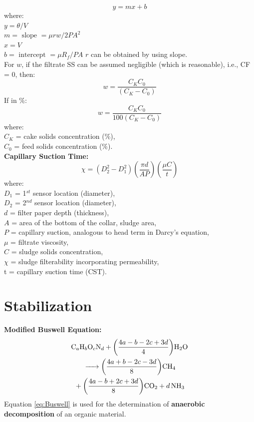 \documentclass[a4paper, landscape]{article}
\begin{document}
\begin{multicols}{4}
\[
y=mx+b
\]
where:\\
$y = \theta/V$\\
$m = \text{ slope } = \mu rw / 2 PA^2$\\
$x = V$\\
$b = \text{ intercept } = \mu R_f / PA$
$r$ can be obtained by using slope.\\
For $w$, if the filtrate SS can be assumed negligible (which is reasonable), i.e., CF = 0, then:
\[
w = \frac{C_KC_0}{(C_K-C_0)}
\]
If in \%:
\[
w = \frac{C_KC_0}{100(C_K-C_0)}
\]
where:\\
$C_K$ = cake solids concentration (\%),\\
$C_0$ = feed solids concentration (\%).\\
\textbf{Capillary Suction Time:}
\[
\chi = (D_2^2 - D_1^2)\left(\frac{\pi d}{ A P }\right)\left(\frac{\mu C}{t}\right)
\]
where:\\
$D_1$ = 1$^{st}$ sensor location (diameter),\\
$D_2$ = 2$^{nd}$ sensor location (diameter),\\
$d$ = filter paper depth (thickness),\\
$A$ = area of the bottom of the collar, sludge area,\\
$P$ = capillary suction, analogous to head term in Darcy's equation,\\
$\mu$ = filtrate viscosity,\\
$C$ = sludge solids concentration,\\
$\chi$ = sludge filterability incorporating permeability,\\
t = capillary suction time (CST).
\section*{Stabilization}
\textbf{Modified Buswell Equation:}
\begin{multline}
    \ce{C_aH_bO_cN_d + $\left(\frac{4a - b - 2c + 3d}{4}\right)$H2O\\ -> $\left(\frac{4a + b - 2c - 3d}{8}\right)$CH4 \\+ $\left(\frac{4a - b + 2c + 3d}{8}\right)$CO2 + $d$NH3}
    \label{eq:Buswell}
\end{multline}
Equation \ref{eq:Buswell} is used for the determination of \textbf{anaerobic decomposition} of an organic material.
\end{multicols}
\end{document}
